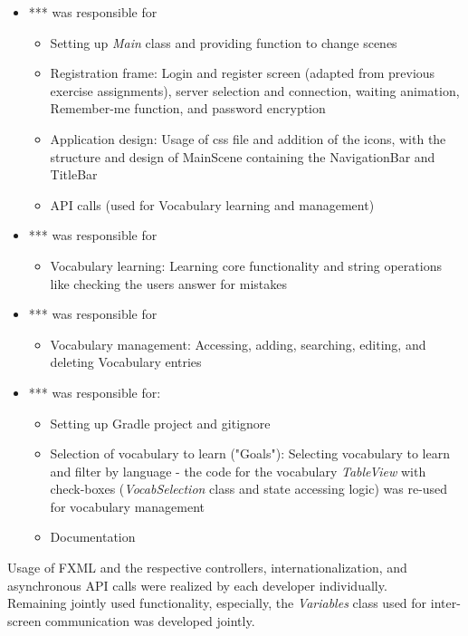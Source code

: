 \begin{itemize}
    \item *** was responsible for %
    \begin{itemize}
        \item Setting up \textit{Main} class and providing function to change scenes
        \item Registration frame: Login and register screen (adapted from previous exercise assignments), server selection and connection, waiting animation, Remember-me function, and password encryption
        \item Application design: Usage of css file and addition of the icons, with the structure and design of MainScene containing the NavigationBar and TitleBar
        \item API calls (used for Vocabulary learning and management)
    \end{itemize}
\item *** was responsible for %
    \begin{itemize}
        \item Vocabulary learning: Learning core functionality and string operations like checking the users answer for mistakes
    \end{itemize}
\item *** was responsible for %
    \begin{itemize}
        \item Vocabulary management: Accessing, adding, searching, editing, and deleting Vocabulary entries
    \end{itemize}
\item *** was responsible for: %
    \begin{itemize}
        \item Setting up Gradle project and gitignore
        \item Selection of vocabulary to learn ("Goals"): Selecting vocabulary to learn and filter by language - the code for the vocabulary \textit{TableView} with check-boxes (\textit{VocabSelection} class and state accessing logic) was re-used for vocabulary management
        \item Documentation
    \end{itemize}
\end{itemize}

Usage of FXML and the respective controllers, internationalization, and asynchronous API calls were realized by each developer individually. \\
Remaining jointly used functionality, especially, the \textit{Variables} class used for inter-screen communication was developed jointly. 

